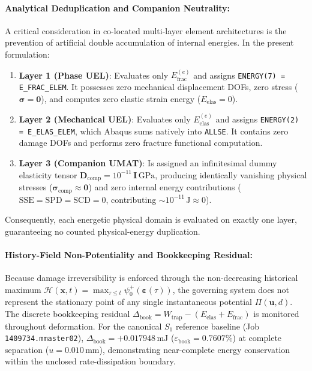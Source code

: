\paragraph{Analytical Deduplication and Companion Neutrality:}
A critical consideration in co-located multi-layer element architectures is the prevention of artificial double accumulation of internal energies. In the present formulation:
\begin{enumerate}
    \item \textbf{Layer 1 (Phase UEL)}: Evaluates only $E_{\mathrm{frac}}^{(e)}$ and assigns \texttt{ENERGY(7) = E\_FRAC\_ELEM}. It possesses zero mechanical displacement DOFs, zero stress ($\boldsymbol{\sigma} = \mathbf{0}$), and computes zero elastic strain energy ($E_{\mathrm{elas}} = 0$).
    \item \textbf{Layer 2 (Mechanical UEL)}: Evaluates only $E_{\mathrm{elas}}^{(e)}$ and assigns \texttt{ENERGY(2) = E\_ELAS\_ELEM}, which Abaqus sums natively into \texttt{ALLSE}. It contains zero damage DOFs and performs zero fracture functional computation.
    \item \textbf{Layer 3 (Companion UMAT)}: Is assigned an infinitesimal dummy elasticity tensor $\mathbf{D}_{\mathrm{comp}} = 10^{-11}\,\mathbf{I}\,\mathrm{GPa}$, producing identically vanishing physical stresses ($\boldsymbol{\sigma}_{\mathrm{comp}} \approx \mathbf{0}$) and zero internal energy contributions ($\text{SSE} = \text{SPD} = \text{SCD} = 0$, contributing $\sim 10^{-11}\,\mathrm{J} \approx 0$).
\end{enumerate}
Consequently, each energetic physical domain is evaluated on exactly one layer, guaranteeing no counted physical-energy duplication.

\paragraph{History-Field Non-Potentiality and Bookkeeping Residual:}
Because damage irreversibility is enforced through the non-decreasing historical maximum $\mathcal{H}(\mathbf{x}, t) = \max_{\tau \le t} \psi_0^+(\boldsymbol{\varepsilon}(\tau))$, the governing system does not represent the stationary point of any single instantaneous potential $\Pi(\mathbf{u}, d)$. The discrete bookkeeping residual $\Delta_{\mathrm{book}} = W_{\mathrm{trap}} - (E_{\mathrm{elas}} + E_{\mathrm{frac}})$ is monitored throughout deformation. For the canonical $S_1$ reference baseline (Job \texttt{1409734.mmaster02}), $\Delta_{\mathrm{book}} = \mathbf{+0.017948\,\mathrm{mJ}}$ ($\varepsilon_{\mathrm{book}} = \mathbf{0.7607\%}$) at complete separation ($u = 0.010\,\text{mm}$), demonstrating near-complete energy conservation within the unclosed rate-dissipation boundary.

